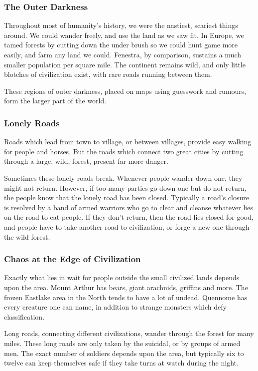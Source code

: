 \begin{multicols}{2}
\subsubsection{The Outer Darkness}

Throughout most of humanity's history, we were the nastiest, scariest things around.
We could wander freely, and use the land as we saw fit.
In Europe, we tamed forests by cutting down the under brush so we could hunt game more easily, and farm any land we could.
Fenestra, by comparison, sustains a much smaller population per square mile.
The continent remains wild, and only little blotches of civilization exist, with rare roads running between them.

These regions of outer darkness, placed on maps using guesswork and rumours, form the larger part of the world.

\subsubsection{Lonely Roads}

Roads which lead from town to village, or between villages, provide easy walking for people and horses.
But the roads which connect two great cities by cutting through a large, wild, forest, present far more danger.

Sometimes these lonely roads break.
Whenever people wander down one, they might not return.
However, if too many parties go down one but do not return, the people know that the lonely road has been closed.
Typically a  road's closure is resolved by a band of armed warriors who go to clear and cleanse whatever lies on the road to eat people.
If they don't return, then the road lies closed for good, and people have to take another road to civilization, or forge a new one through the wild forest.

\subsubsection{Chaos at the Edge of Civilization}

Exactly what lies in wait for people outside the small civilized lands depends upon the area.
Mount Arthur has bears, giant arachnids, griffins and more.
The frozen Eastlake area in the North tends to have a lot of undead.
Quennome has every creature one can name, in addition to strange monsters which defy classification.

Long roads, connecting different civilizations, wander through the forest for many miles.
These long roads are only taken by the suicidal, or by groups of armed men.
The exact number of soldiers depends upon the area, but typically six to twelve can keep themselves safe if they take turns at watch during the night.


\end{multicols}
